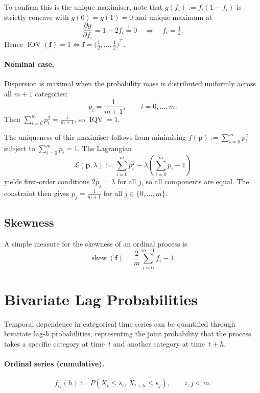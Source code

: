 \documentclass[12pt,a4paper]{scrreprt}
\DeclareMathOperator{\IOV}{IOV}
\DeclareMathOperator{\IQV}{IQV}
\begin{document}
To confirm this is the unique maximiser, note that $g(f_i) := f_i(1-f_i)$ is strictly concave
with $g(0) = g(1) = 0$ and unique maximum at
\[
    \frac{\partial g}{\partial f_i} = 1 - 2f_i \overset{!}{=} 0
    \quad \Longrightarrow \quad
    f_i = \tfrac{1}{2}.
\]
Hence $\IOV(\mathbf{f}) = 1 \Leftrightarrow \mathbf{f} = \bigl(\tfrac{1}{2}, \ldots,
\tfrac{1}{2}\bigr)^{\top}$.

\paragraph{Nominal case.}
Dispersion is maximal when the probability mass is distributed uniformly across all $m+1$
categories:
\[
    p_i = \frac{1}{m+1}, \qquad i = 0,\ldots,m.
\]
Then $\sum_{i=0}^m p_i^2 = \tfrac{1}{m+1}$, so $\IQV = 1$.

The uniqueness of this maximiser follows from minimising $f(\mathbf{p}) := \sum_{i=0}^m p_i^2$
subject to $\sum_{i=0}^m p_i = 1$. The Lagrangian
\[
    \mathcal{L}(\mathbf{p},\lambda)
    := \sum_{i=0}^m p_i^2 - \lambda\!\left(\sum_{i=0}^m p_i - 1\right)
\]
yields first-order conditions $2p_j = \lambda$ for all $j$, so all components are equal. The
constraint then gives $p_j = \tfrac{1}{m+1}$ for all $j \in \{0,\ldots,m\}$.

\subsection{Skewness}

A simple measure for the skewness of an ordinal process is
\[
    \operatorname{skew}(\mathbf{f}) = \frac{2}{m} \sum_{i=0}^{m-1} f_i - 1.
\]

\section{Bivariate Lag Probabilities}

Temporal dependence in categorical time series can be quantified through bivariate
lag-$h$ probabilities, representing the joint probability that the process takes a specific
category at time~$t$ and another category at time~$t+h$.

\paragraph{Ordinal series (cumulative).}
\[
    f_{ij}(h) := P(X_t \leq s_i,\, X_{t+h} \leq s_j),
    \qquad i,j < m.
\]
\end{document}
